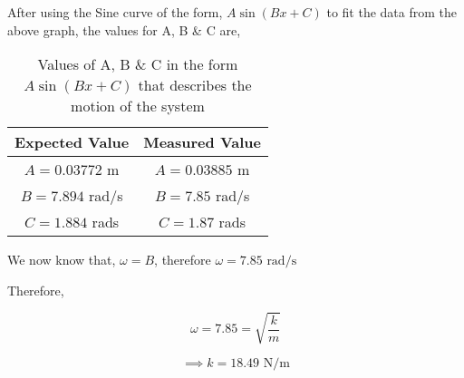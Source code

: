 	{After using the Sine curve of the form, $A\sin\left(Bx + C\right)$ to fit the data from the above graph, the values for A, B \& C are,}
			
	\begin{table}[H]
    \centering
    		\begin{tabular}{|c|c|}
    			\hline
    			\hline
        		Expected Value & Measured Value \\
        		\hline
        		$A = 0.03772$ m & $A = 0.03885$ m \\
        		\hline
        		$B = 7.894$ rad/s & $B = 7.85$ rad/s \\
        		\hline
        		$C = 1.884$ rads & $C = 1.87$ rads \\
			\hline        		
        		\hline
    		\end{tabular}
    		\caption{Values of A, B \& C in the form $A\sin\left(Bx + C\right)$ that describes the motion of the system}
    		\label{Part II}
	\end{table}

	{We now know that, $\omega = B$, therefore $\omega = 7.85\text{ rad/s}$}

	{Therefore,}

		$$\omega = 7.85 = \sqrt{\frac{k}{m}}$$

		$$\implies k = 18.49 \text{ N/m}$$